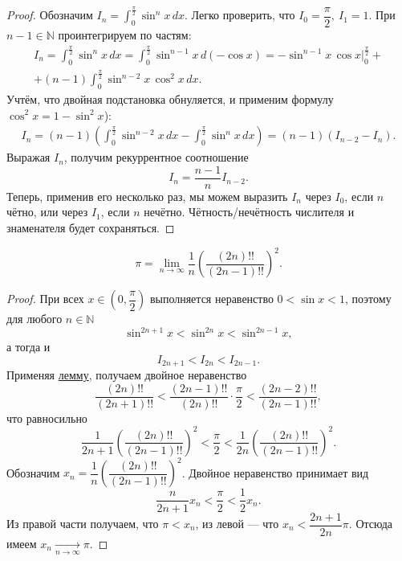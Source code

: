 \begin{proof}
	Обозначим \(I_n = \displaystyle\int_0^{\frac{\pi}{2}} \sin^n x \, dx\). Легко проверить, что \(I_0 = \dfrac{\pi}{2}, \ I_1 = 1\). При \(n - 1 \in \mathbb{N}\) проинтегрируем по частям:
	\begin{multline*}
		I_n = \int_0^{\frac{\pi}{2}} \sin^n x \, dx = \int_0^{\frac{\pi}{2}} \sin^{n - 1} x \, d(-\cos x) = -\sin^{n - 1} x \, \cos x \bigg|_0^{\frac{\pi}{2}} + \\ 
		+ (n - 1) \int_0^\frac{\pi}{2} \sin^{n - 2} x \, \cos^2 x \, dx.
	\end{multline*}
	Учтём, что двойная подстановка обнуляется, и применим формулу \linebreak \(\cos^2 x = 1 - \sin^2 x\)):
	\begin{multline*}
		I_n = (n - 1) \left(\int_0^\frac{\pi}{2} \sin^{n - 2} x \, dx - \int_0^\frac{\pi}{2} \sin^n x \, dx \right) = (n - 1) (I_{n - 2} - I_n).
	\end{multline*}
	Выражая \(I_n\), получим рекуррентное соотношение \[
	I_n = \frac{n - 1}{n} I_{n - 2}.
	\]
	Теперь, применив его несколько раз, мы можем выразить \(I_n\) через \(I_0\), если \(n\) чётно, или через \(I_1\), если \(n\) нечётно. Чётность/нечётность числителя и знаменателя будет сохраняться.
\end{proof}

\hypertarget{wall}{}
\begin{theorem}
	\[
	\pi = \lim_{n \to \infty} \frac{1}{n} \left(\frac{(2n)!!}{(2n - 1)!!} \right)^2.
	\]
\end{theorem}
\begin{proof}
	При всех \(x \in \left(0, \dfrac{\pi}{2} \right)\) выполняется неравенство \linebreak \(0 < \sin x < 1\), поэтому для любого \(n \in \mathbb{N}\) \[
	\sin^{2n + 1} x < \sin^{2n} x < \sin^{2n - 1} x,
	\]
	а тогда и \[
	I_{2n + 1} < I_{2n} < I_{2n - 1}.
	\]
	Применяя \hyperlink{vallem}{лемму}, получаем двойное неравенство \[
	\frac{(2n)!!}{(2n + 1)!!} < \frac{(2n - 1)!!}{(2n)!!} \cdot \frac{\pi}{2} < \frac{(2n - 2)!!}{(2n - 1)!!},
	\]
	что равносильно \[
	\frac{1}{2n + 1} \left(\frac{(2n)!!}{(2n - 1)!!} \right)^2 < \frac{\pi}{2} < \frac{1}{2n} \left(\frac{(2n)!!}{(2n - 1)!!} \right)^2.
	\]
	Обозначим \(x_n = \dfrac{1}{n} \left(\dfrac{(2n)!!}{(2n - 1)!!} \right)^2\). Двойное неравенство принимает вид \[
	\frac{n}{2n + 1} x_n < \frac{\pi}{2} < \frac{1}{2} x_n.
	\]
	Из правой части получаем, что \(\pi < x_n\), из левой --- что \(x_n < \dfrac{2n + 1}{2n} \pi\). Отсюда имеем \(x_n \xrightarrow[n \to \infty]{} \pi\).
\end{proof}

